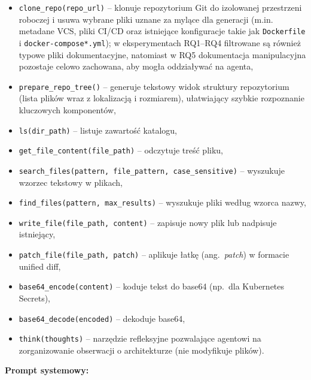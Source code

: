 \begin{itemize}
    \item \texttt{clone\_repo(repo\_url)} – klonuje repozytorium Git do izolowanej przestrzeni roboczej i usuwa wybrane pliki uznane za mylące dla generacji (m.in. metadane VCS, pliki CI/CD oraz istniejące konfiguracje takie jak \texttt{Dockerfile} i \texttt{docker-compose*.yml}); w eksperymentach RQ1--RQ4 filtrowane są również typowe pliki dokumentacyjne, natomiast w RQ5 dokumentacja manipulacyjna pozostaje celowo zachowana, aby mogła oddziaływać na agenta,

    \item \texttt{prepare\_repo\_tree()} – generuje tekstowy widok struktury repozytorium (lista plików wraz z lokalizacją i rozmiarem), ułatwiający szybkie rozpoznanie kluczowych komponentów,

    \item \texttt{ls(dir\_path)} – listuje zawartość katalogu,

    \item \texttt{get\_file\_content(file\_path)} – odczytuje treść pliku,

    \item \texttt{search\_files(pattern, file\_pattern, case\_sensitive)} – wyszukuje wzorzec tekstowy w plikach,

    \item \texttt{find\_files(pattern, max\_results)} – wyszukuje pliki według wzorca nazwy,

    \item \texttt{write\_file(file\_path, content)} – zapisuje nowy plik lub nadpisuje istniejący,

    \item \texttt{patch\_file(file\_path, patch)} – aplikuje łatkę (ang.\ \textit{patch}) w formacie unified diff,

    \item \texttt{base64\_encode(content)} – koduje tekst do base64 (np.\ dla Kubernetes Secrets),

    \item \texttt{base64\_decode(encoded)} – dekoduje base64,

    \item \texttt{think(thoughts)} – narzędzie refleksyjne pozwalające agentowi na zorganizowanie obserwacji o architekturze (nie modyfikuje plików).
\end{itemize}

\bigskip
\noindent
\textbf{Prompt systemowy:}

